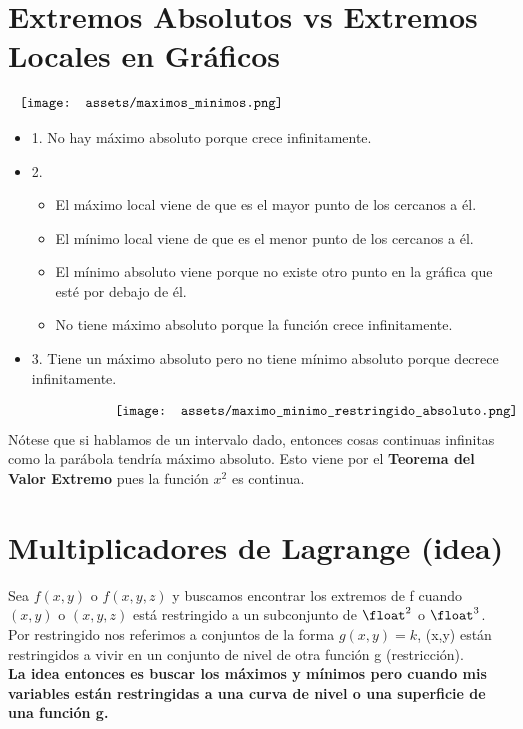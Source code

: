 \documentclass[10pt,a4paper]{article}
\begin{document}
\section*{Extremos Absolutos vs Extremos Locales en Gráficos}
\[\begin{minipage}[b]{1\textwidth}
    \texttt{[image: assets/maximos\_minimos.png]}
\end{minipage}\]
\begin{itemize}
    \item 1. No hay máximo absoluto porque crece infinitamente.
    \item 2. 
    \begin{itemize}
        \item El máximo local viene de que es el mayor punto de los cercanos a él. 
        \item El mínimo local viene de que es el menor punto de los cercanos a él.
        \item El mínimo absoluto viene porque no existe otro punto en la gráfica que esté por debajo de él.
        \item No tiene máximo absoluto porque la función crece infinitamente.
    \end{itemize}
    \item 3. Tiene un máximo absoluto pero no tiene mínimo absoluto porque decrece infinitamente.
\end{itemize}
\[\begin{minipage}[b]{0.6\textwidth}
    \texttt{[image: assets/maximo\_minimo\_restringido\_absoluto.png]}
\end{minipage}\]
Nótese que si hablamos de un intervalo dado, entonces cosas continuas infinitas como la parábola tendría máximo absoluto. Esto viene por el \textbf{Teorema del Valor Extremo} pues la función $x^{2}$ es continua.
\section*{Multiplicadores de Lagrange (idea)}
Sea $f(x,y)$ o $f(x,y,z)$ y buscamos encontrar los extremos de f cuando $(x,y)$ o $(x,y,z)$ está restringido a un subconjunto de $\float^{2}$ o $\float^{3}$. \\
Por restringido nos referimos a conjuntos de la forma $g(x,y) = k$, (x,y) están restringidos a vivir en un conjunto de nivel de otra función g (restricción). \\
\textbf{La idea entonces es buscar los máximos y mínimos pero cuando mis variables están restringidas a una curva de nivel o una superficie de una función g.}
\end{document}
